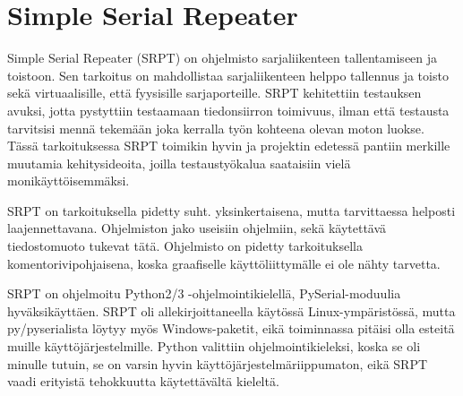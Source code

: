 



\section{Simple Serial Repeater}

Simple Serial Repeater (SRPT) on ohjelmisto sarjaliikenteen tallentamiseen ja toistoon. Sen tarkoitus on mahdollistaa sarjaliikenteen helppo tallennus ja toisto sekä virtuaalisille, että fyysisille sarjaporteille. SRPT kehitettiin testauksen avuksi, jotta pystyttiin testaamaan tiedonsiirron toimivuus, ilman että testausta tarvitsisi mennä tekemään joka kerralla työn kohteena olevan moton luokse. Tässä tarkoituksessa SRPT toimikin hyvin ja projektin edetessä pantiin merkille muutamia kehitysideoita, joilla testaustyökalua saataisiin vielä monikäyttöisemmäksi.

SRPT on tarkoituksella pidetty suht. yksinkertaisena, mutta tarvittaessa helposti laajennettavana. Ohjelmiston jako useisiin ohjelmiin, sekä käytettävä tiedostomuoto tukevat tätä. Ohjelmisto on pidetty tarkoituksella komentorivipohjaisena, koska graafiselle käyttöliittymälle ei ole nähty tarvetta.

SRPT on ohjelmoitu Python2/3 -ohjelmointikielellä, PySerial-moduulia hyväksikäyttäen. SRPT oli allekirjoittaneella käytössä Linux-ympäristössä, mutta py/pyserialista löytyy myös Windows-paketit, eikä toiminnassa pitäisi olla esteitä muille käyttöjärjestelmille. Python valittiin ohjelmointikieleksi, koska se oli minulle tutuin, se on varsin hyvin käyttöjärjestelmäriippumaton, eikä SRPT vaadi erityistä tehokkuutta käytettävältä kieleltä.

